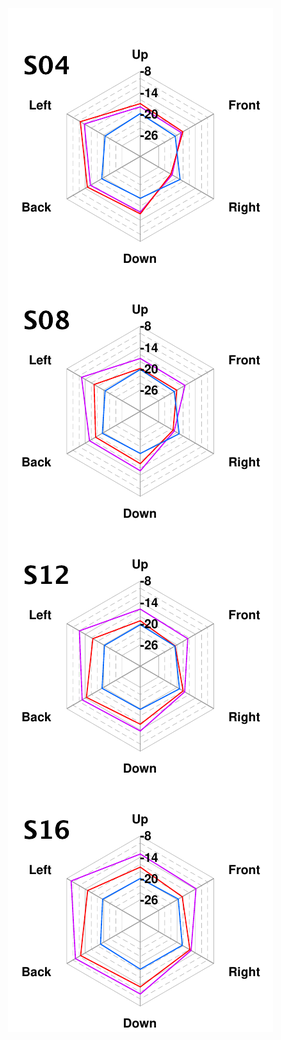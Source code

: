 \documentclass[11pt,a4j]{jreport}
\begin{document}
\begin{figure}[H]
\begin{minipage}{.5\linewidth}
        \includegraphics[scale=.77]{images/realHallDirSt/allPoint/reshaped/gLeftPage.pdf}
    \end{minipage}
\end{figure}
\end{document}
